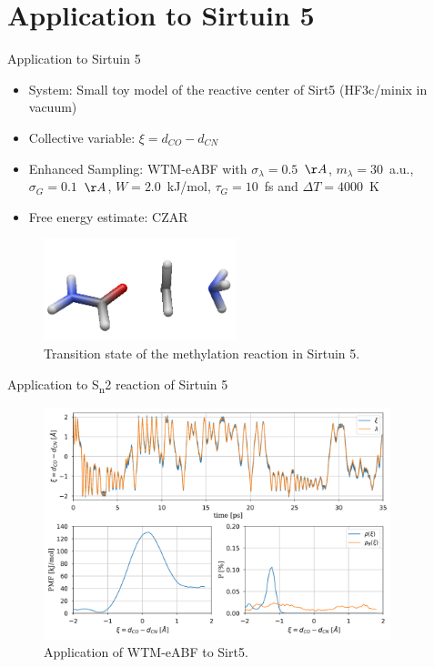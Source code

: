 \documentclass[10pt]{beamer}
\begin{document}
\section{Application to Sirtuin 5}
\begin{frame}{Application to Sirtuin 5}
  \begin{itemize}
   \item System: Small toy model of the reactive center of Sirt5 (HF3c/minix in vacuum)
   \item Collective variable: $\xi=d_{CO}-d_{CN}$
   \item Enhanced Sampling: WTM-eABF with $\sigma_\lambda=0.5$~$\AA$, $m_\lambda=30$~a.u., $\sigma_G=0.1$~$\AA$, $W=2.0$~kJ/mol, $\tau_G=10$~fs and $\Delta T=4000$~K
   \item Free energy estimate: CZAR
\end{itemize}
\begin{figure}[H]
  \centering
    \includegraphics[width=0.5\textwidth]{bilder/talk/sirt52050}
    \caption{Transition state of the methylation reaction in Sirtuin 5.}
\end{figure}
\end{frame}

\begin{frame}{Application to S\textsubscript{n}2 reaction of Sirtuin 5}
   \begin{figure}[H]
     \centering
       \includegraphics[width=0.9\textwidth]{bilder/talk/sirt5_SW_bohr}
      \caption{Application of WTM-eABF to Sirt5.}
   \end{figure}
\end{frame}
\end{document}
